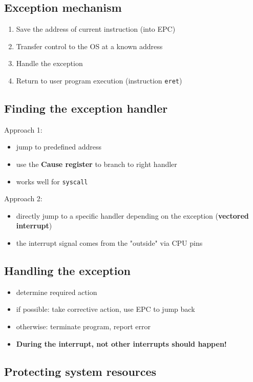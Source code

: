 \documentclass{article}
\newcommand{\T}[1]{\texttt{#1}}
\begin{document}
\subsection{Exception mechanism}

\begin{enumerate}
	\item Save the address of current instruction (into EPC)
	\item Transfer control to the OS at a known address
	\item Handle the exception
	\item Return to user program execution (instruction \T{eret})
\end{enumerate}

\subsection{Finding the exception handler}

Approach 1:
\begin{itemize}
	\item jump to predefined address
	\item use the \textbf{Cause register} to branch to right handler
	\item works well for \T{syscall}
\end{itemize}

Approach 2:
\begin{itemize}
	\item directly jump to a specific handler depending on the exception (\textbf{vectored interrupt})
	\item the interrupt signal comes from the "outside" via CPU pins
\end{itemize}

\subsection{Handling the exception}

\begin{itemize}
	\item determine required action
	\item if possible: take corrective action, use EPC to jump back
	\item otherwise: terminate program, report error
	\item \textbf{During the interrupt, not other interrupts should happen!}
\end{itemize}

\subsection{Protecting system resources}
\end{document}
